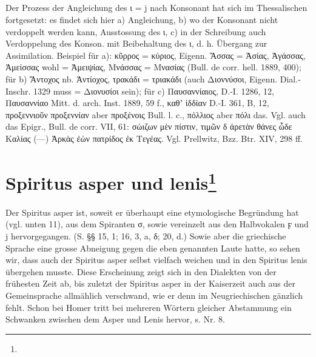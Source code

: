 {\small\noindent\subparagraph{} Der Prozess der Angleichung des ι = j nach
  Konsonant hat sich im Thessalischen fortgesetzt: es findet sich hier a)
  Angleichung, b) wo der Konsonant nicht verdoppelt werden kann, Ausstossung des
  ι, c) in der Schreibung auch Verdoppelung des Konson. mit Beibehaltung des ι,
  d. h. Übergang zur Assimilation. Beispiel für a): κῦρρος = κύριος, Eigenn.
  Ἄσσας = Ἀσίας, Ἀγάσσας, Ἀμείσσας wohl = Ἀμειψίας, Μνάσσας = Μνασίας (Bull. de
  corr. hell. 1889, 400); für b) Ἄντοχος nb. Ἀντίοχος, τρακάδι = τριακάδι (auch
  Διοννύσοι, Eigenn. Dial.- Inschr. 1329 muss = Διονυσίοι sein); für c)
  Παυσαννίαιος, D.-I. 1286, 12, Παυσαννίαο Mitt. d. arch. Inst. 1889, 59 f.,
  καθʼ ἱδδίαν D.-I. 361, Β, 12, προξεννιοῦν προξεννίαν aber προξένοις Bull. l.
  c., πόλλιος aber πόλι das. Vgl. auch das Epigr., Bull. de corr. VII, 61:
  σώιζων μὲν πίστιν, τιμῶν δ ἀρετὰν θάνες ὧδε Καλίας (—) Ἀρκὰς ἐὼν πατρίδος ἐκ
Τεγέας. Vgl. Prellwitz, Bzz. Btr. XIV, 298 ff.}

\section[Spiritus asper und lenis]{Spiritus asper und lenis\protect\footnote{}}\label{sec:22}

\paragraph{} Der Spiritus asper ist, soweit er überhaupt eine etymologische
Begründung hat (vgl. unten 11), aus dem Spiranten σ, sowie vereinzelt aus den
Halbvokalen ϝ und j hervorgegangen. (S. §§ 15, 1; 16, 3, a, δ; 20, d.) Sowie
aber die griechische Sprache eine grosse Abneigung gegen die eben genannten
Laute hatte, so sehen wir, dass auch der Spiritus asper selbst vielfach weichen
und in den Spiritus lenis übergehen musste. Diese Erscheinung zeigt sich in den
Dialekten von der frühesten Zeit ab, bis zuletzt der Spiritus asper in der
Kaiserzeit auch aus der Gemeinsprache allmählich verschwand, wie er denn im
Neugriechischen gänzlich fehlt. Schon bei Homer tritt bei mehreren Wörtern
gleicher Abstammung ein Schwanken zwischen dem Asper und Lenis hervor, s. Nr. 8.


